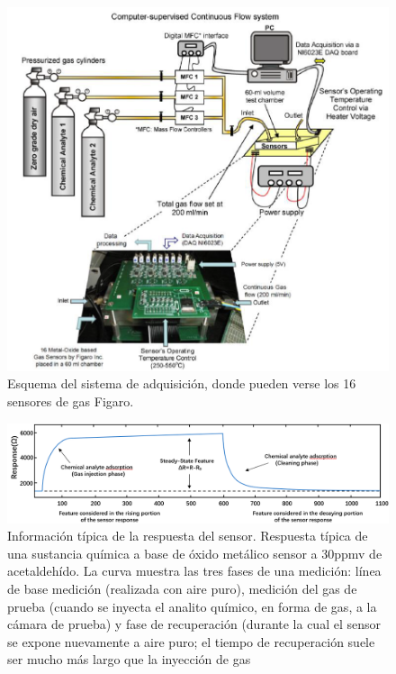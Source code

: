 \begin{figure}
	\centering
	\includegraphics[width=0.95\linewidth]{../py_imgs/sensor_photo}
	\caption[Esquema de sistema de adquisición de datos]{Esquema del sistema de adquisición, donde pueden verse los 16 sensores de gas Figaro.}
	\label{fig:sensorphoto}
\end{figure}

\begin{figure}
	\centering
	\includegraphics[width=0.95\linewidth]{../py_imgs/sensor_response}
	\caption[Respuesta del sensor]{Información típica de la respuesta del sensor. Respuesta típica de una sustancia química a base de óxido metálico sensor a 30ppmv de acetaldehído. La curva muestra las tres fases de una medición: línea de base medición (realizada con aire puro), medición del gas de prueba (cuando se inyecta el analito químico, en forma de gas, a la cámara de prueba) y fase de recuperación (durante la cual el sensor se expone nuevamente a aire puro; el tiempo de recuperación suele ser mucho más largo que la inyección de gas\protect\cite{Vergara2011}}
	\label{fig:sensor_response}
\end{figure}

